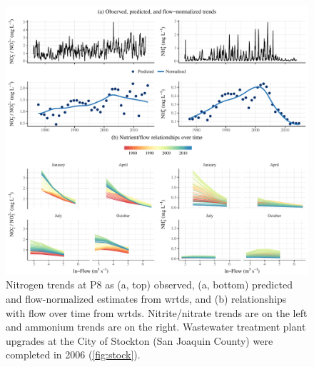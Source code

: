 \documentclass[journal = esthag, manuscript = article]{achemso}\usepackage[]{graphicx}\usepackage[]{color}
\begin{document}
\begin{figure}[!ht]

{\centering \includegraphics[width=\textwidth]{figs/p8trnds-1} 

}

\caption{Nitrogen trends at P8 as (a, top) observed, (a, bottom) predicted and flow-normalized estimates from \ac{wrtds}, and (b) relationships with flow over time from \ac{wrtds}.  Nitrite/nitrate trends are on the left and ammonium trends are on the right.  Wastewater treatment plant upgrades at the City of Stockton (San Joaquin County) were completed in 2006 (\cref{fig:stock}).}\label{fig:p8trnds}
\end{figure}
\end{document}
